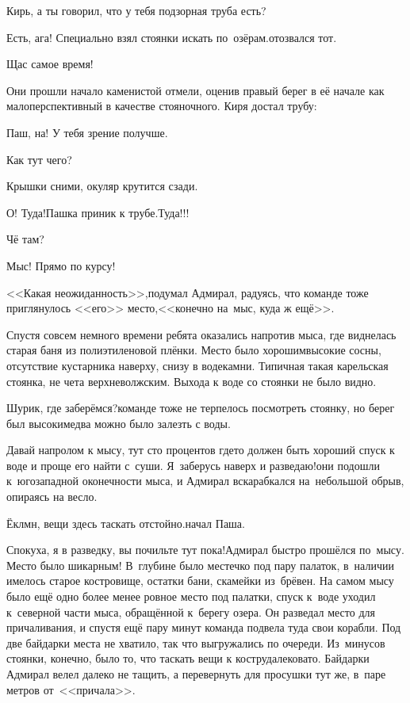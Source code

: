 \diagdash Кирь, а ты говорил, что у тебя подзорная труба есть?

\diagdash Есть, ага! Специально взял стоянки искать по~озёрам.\mdash отозвался тот.  

\diagdash Щас самое время!

Они прошли начало каменистой отмели, оценив правый берег в её начале как малоперспективный в качестве стояночного. Киря достал трубу:

\diagdash Паш, на! У тебя зрение получше.

\diagdash Как тут чего?

\diagdash Крышки сними, окуляр крутится сзади.

\diagdash О! Туда!\mdash Пашка приник к трубе.\mdash Туда!!!

\diagdash Чё там?

\diagdash Мыс! Прямо по курсу!

<<Какая неожиданность>>,\mdash подумал Адмирал, радуясь, что команде тоже приглянулось <<его>> место,\mdash <<конечно на~мыс, куда ж ещё>>.

Спустя совсем немного времени ребята оказались напротив мыса, где виднелась старая баня из полиэтиленовой плёнки. Место было хорошим\mdash высокие сосны, отсутствие кустарника наверху, снизу в воде\mdash камни. Типичная такая карельская стоянка, не чета верхневолжским. Выхода к воде со стоянки не было видно. 

\diagdash Шурик, где заберёмся?\mdash команде тоже не терпелось посмотреть стоянку, но берег был высоким\mdash едва можно было залезть с воды.

\diagdash Давай напролом к мысу, тут сто процентов где\sdash то должен быть хороший спуск к воде и проще его найти с~суши. Я~заберусь наверх и разведаю!\mdash они подошли к~юго\sdash западной оконечности мыса, и Адмирал вскарабкался на~небольшой обрыв, опираясь на весло.

\diagdash Ёклмн, вещи здесь таскать отстойно.\mdash начал Паша. 

\diagdash Спокуха, я в разведку, вы почильте тут пока!\mdash Адмирал быстро прошёлся по~мысу. Место было шикарным! В~глубине было местечко под пару палаток, в~наличии имелось старое костровище, остатки бани, скамейки из~брёвен. На самом мысу было ещё одно более менее ровное место под палатки, спуск к~воде уходил к~северной части мыса, обращённой к~берегу озера. Он разведал место для причаливания, и спустя ещё пару минут команда подвела туда свои корабли. Под две байдарки места не хватило, так что выгружались по очереди. Из~минусов стоянки, конечно, было то, что таскать вещи к костру\mdash далековато. Байдарки Адмирал велел далеко не тащить, а перевернуть для просушки тут же, в~паре метров от~<<причала>>.

